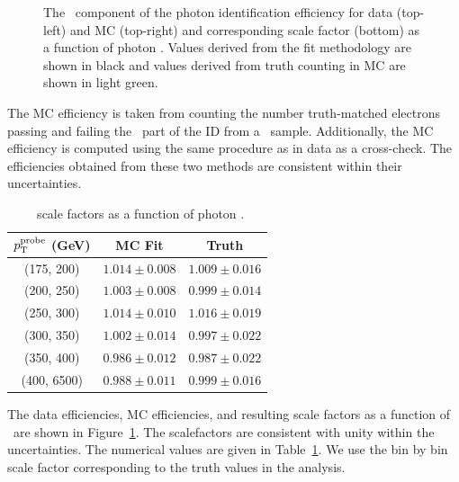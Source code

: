 \begin{figure}[htbp]
{  }
  \caption{
    The \egamma\ component of the photon identification efficiency for data (top-left) and MC (top-right) and corresponding scale factor (bottom) as a function of photon \pt.
    Values derived from the fit methodology are shown in black and values derived from truth counting in MC are shown in light green.
  }
  \label{fig:idsf_results}
\end{figure}

The MC efficiency is taken from counting the number truth-matched electrons passing and failing the \egamma\ part of the ID from a \Zee\ sample. 
Additionally, the MC efficiency is computed using the same procedure as in data as a cross-check.
The efficiencies obtained from these two methods are consistent within their uncertainties. 

\begin{table}[htbp]
  \centering
  \begin{tabular}{ c|c|c }
    $p_{\mathrm{T}}^{\mathrm{probe}}$ (GeV) & MC Fit & Truth \\\hline
    (175, 200)  & $1.014 \pm 0.008$ & $1.009 \pm 0.016$ \\
    (200, 250)  & $1.003 \pm 0.008$ & $0.999 \pm 0.014$ \\
    (250, 300)  & $1.014 \pm 0.010$ & $1.016 \pm 0.019$ \\
    (300, 350)  & $1.002 \pm 0.014$ & $0.997 \pm 0.022$ \\
    (350, 400)  & $0.986 \pm 0.012$ & $0.987 \pm 0.022$ \\
    (400, 6500)  & $0.988 \pm 0.011$ & $0.999 \pm 0.016$ \\
  \end{tabular}
  \caption{\egamma\ scale factors as a function of photon \pt.}
  \label{tab:idsf_results}
\end{table}

The data efficiencies, MC efficiencies, and resulting scale factors as a function of \pt\ are shown in Figure~\ref{fig:idsf_results}. 
The scalefactors are consistent with unity within the uncertainties. 
The numerical values are given in Table~\ref{tab:idsf_results}. 
We use the bin by bin scale factor corresponding to the truth values in the analysis. %
